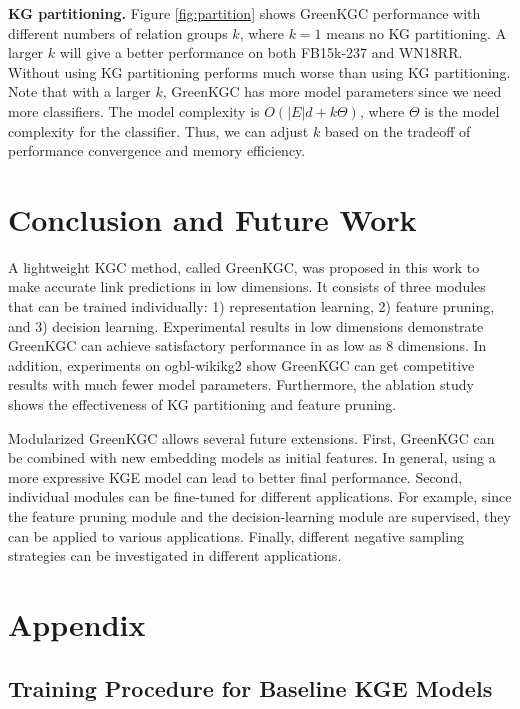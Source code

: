 \documentclass{article}
\begin{document}
{\color{black}
\textbf{KG partitioning.} Figure \ref{fig:partition} shows GreenKGC performance with
different numbers of relation groups $k$, where $k = 1$ means no KG partitioning.
A larger $k$ will give a better performance on both FB15k-237 and WN18RR. Without using KG
partitioning performs much worse than using KG partitioning.
Note that with a larger $k$, GreenKGC has more model parameters since we need more classifiers.
The model complexity is $O(|E|d + k\Theta)$, where $\Theta$ is the model complexity for the
classifier. Thus, we can adjust $k$ based on the tradeoff of performance convergence 
and memory efficiency.
}

\section{Conclusion and Future Work} \label{sec:conclusion}

A lightweight KGC method, called GreenKGC, was proposed in this work
to make accurate link predictions in low dimensions. It consists of three modules that
can be trained individually: 1) representation learning, 2) feature pruning,
and 3) decision learning. Experimental results in low dimensions demonstrate
GreenKGC can achieve satisfactory performance in as low as 8 dimensions. In addition,
experiments on ogbl-wikikg2 show GreenKGC can get competitive results 
with much fewer model parameters. Furthermore, the ablation study shows the 
effectiveness of KG partitioning and feature pruning.

{\color{black} Modularized GreenKGC allows several future extensions. 
First, GreenKGC can be combined with new embedding
models as initial features. In general, using a more expressive KGE model can
lead to better final performance. Second, individual modules can
be fine-tuned for different applications. For example, since the feature
pruning module and the decision-learning module are supervised, they can
be applied to various applications. Finally, different negative sampling
strategies can be investigated in different applications.}


\renewcommand\refname{Reference}


\newpage
\section{Appendix}

\subsection{Training Procedure for Baseline KGE Models}\label{appendix:emb}
\end{document}

